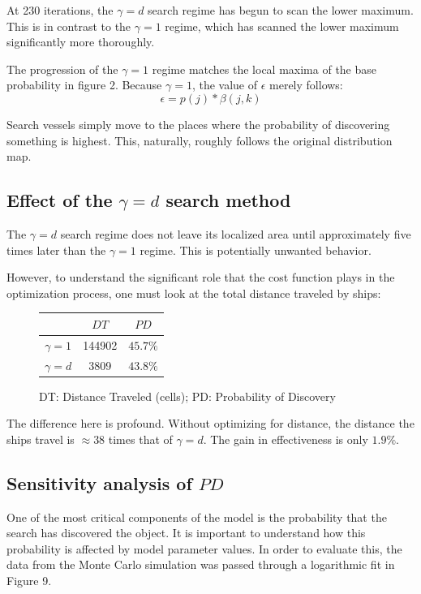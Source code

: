 \documentclass[a4paper]{article}
\begin{document}
At 230 iterations, the $\gamma=d$ search regime has begun to scan the lower maximum. This is in contrast to the $\gamma=1$ regime, which has scanned the lower maximum significantly more thoroughly.

The progression of the $\gamma=1$ regime matches the local maxima of the base probability in figure 2. Because $\gamma=1$, the value of $\epsilon$ merely follows: $$\epsilon = p(j)*\beta(j,k)$$

Search vessels simply move to the places where the probability of discovering something is highest. This, naturally, roughly follows the original distribution map.

\subsection{Effect of the $\gamma=d$ search method}

The $\gamma=d$ search regime does not leave its localized area until approximately five times later than the $\gamma=1$ regime. This is potentially unwanted behavior. 

However, to understand the significant role that the cost function plays in the optimization process, one must look at the total distance traveled by ships:

\begin{figure}[H]\begin{center}
\begin{tabular}{|c|c|c|}
\hline & $DT$ & $PD$\\\hline\hline
$\gamma=1$ & 144902 & $45.7\%$\\\hline
$\gamma=d$ & 3809 & $43.8\%$\\\hline
\end{tabular}
\caption{DT: Distance Traveled (cells); PD: Probability of Discovery}
\end{center}\end{figure}

The difference here is profound. Without optimizing for distance, the distance the ships travel is $\approx 38$ times that of $\gamma=d$. The gain in effectiveness is only $1.9\%$.

\subsection{Sensitivity analysis of $PD$}

One of the most critical components of the model is the probability that the search has discovered the object. It is important to understand how this probability is affected by model parameter values. In order to evaluate this, the data from the Monte Carlo simulation was passed through a logarithmic fit in Figure 9.
\end{document}
